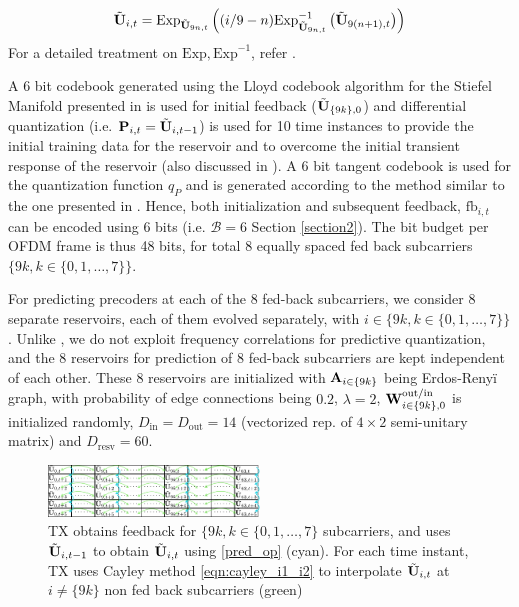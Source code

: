 \documentclass[conference]{IEEEtran}
\begin{document}
{\begin{equation}
\label{eqn:cayley_i1_i2}
  \tilde{\bU}_{i,t} =  \text{Exp}_{\tilde{\bU}_{9n, t}}\left((i/9-n)\text{Exp}^{-1}_{\tilde{\bU}_{9n, t}}\left(\tilde{\bU}_{9(n+1),t}\right)\right)
\end{equation}
For a detailed treatment on $\text{Exp}, \text{Exp}^{-1}$, refer \cite{Gupt1905:Predictive,DBLP:journals/corr/abs-1708-00045}.

A $6$ bit codebook generated using the Lloyd codebook algorithm for the Stiefel Manifold presented in \cite{6678348} is used for initial feedback ($\tilde{{\bf U}}_{\{9k\},0}$) and differential quantization (i.e. ${\bf P}_{i,t}=\tilde{{\bf U}}_{i,t-1}$) is used for 10 time instances to provide the initial training data for the reservoir and to overcome the initial transient response of the reservoir (also discussed in \cite{mosleh2017brain}).
A $6$ bit tangent codebook is used for the quantization function $q_P$ and is generated according to the method similar to the one presented in \cite{Gupt1905:Predictive}.
Hence, both initialization and subsequent feedback, $\text{fb}_{i,t}$ can be encoded using 6 bits (i.e. $\mathcal{B}=6$ Section \ref{section2}).
The bit budget per OFDM frame is thus 48 bits, for total 8 equally spaced fed back subcarriers $\{9k, k \in \{0,1,\ldots,7\}\}$.

For predicting precoders at each of the $8$ fed-back subcarriers, we consider $8$ separate reservoirs, each of them evolved separately, with $i\in\{9k, k \in \{0,1,\ldots,7\}\}$. Unlike \cite{Gupt1905:Predictive}, we do not exploit frequency correlations for predictive quantization, and the $8$ reservoirs for prediction of $8$ fed-back subcarriers are kept independent of each other.
These 8 reservoirs are initialized with ${\bf A}_{i\in\{9k\}}$ being Erdos-Reny\"i graph, with probability of edge connections being $0.2$, $\lambda=2$, ${\bf W}^{\text{out/in}}_{i\in\{9k\},0}$ is initialized randomly, $D_{\text{in}}=D_{\text{out}}=14$ (vectorized rep. of $4\times2$ semi-unitary matrix) and $D_{\text{resv}}=60$.

\begin{figure}
\centering
\includegraphics[width=0.5\textwidth]{images/table.pdf}
\caption{TX obtains feedback for $\{9k, k \in \{0,1,\ldots,7\}$ subcarriers, and uses $\tilde{{\bf U}}_{i,t-1}$ to obtain $\tilde{{\bf U}}_{i,t}$ using \eqref{pred_op} (cyan). For each time instant, TX uses Cayley method  \eqref{eqn:cayley_i1_i2} to interpolate $\tilde{{\bf U}}_{i,t}$ at $i\neq\{9k\}$ non fed back subcarriers (green)}
\label{table}
\vspace{5pt}
\end{figure}

}
\end{document}
